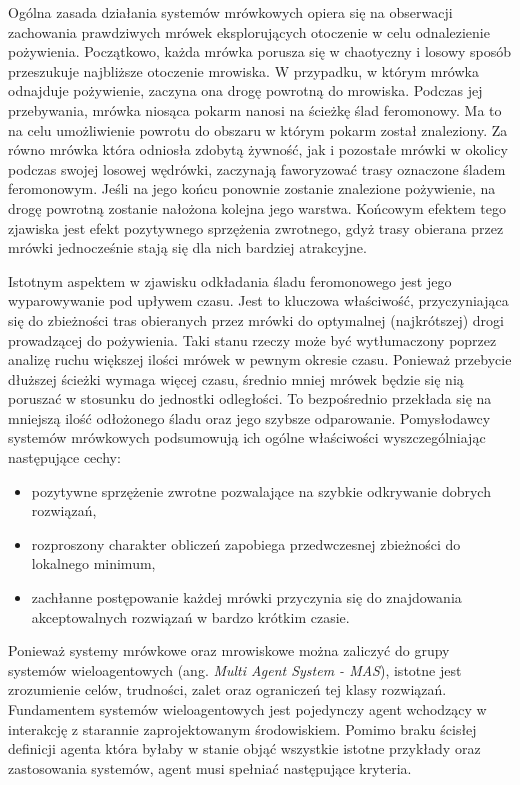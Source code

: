 {    Ogólna zasada działania systemów mrówkowych opiera się na obserwacji zachowania prawdziwych mrówek eksplorujących
    otoczenie w celu odnalezienie pożywienia. Początkowo, każda mrówka porusza się w chaotyczny i losowy sposób
    przeszukuje najbliższe otoczenie mrowiska. W przypadku, w którym mrówka odnajduje pożywienie, zaczyna ona drogę
    powrotną do mrowiska. Podczas jej przebywania, mrówka niosąca pokarm nanosi na ścieżkę ślad feromonowy. Ma to na
    celu umożliwienie powrotu do obszaru w którym pokarm został znaleziony. Za równo mrówka która odniosła zdobytą
    żywność, jak i pozostałe mrówki w okolicy podczas swojej losowej wędrówki, zaczynają faworyzować trasy oznaczone
    śladem feromonowym. Jeśli na jego końcu ponownie zostanie znalezione pożywienie, na drogę powrotną zostanie nałożona
    kolejna jego warstwa. Końcowym efektem tego zjawiska jest efekt pozytywnego sprzężenia zwrotnego, gdyż trasy
    obierana przez mrówki jednocześnie stają się dla nich bardziej atrakcyjne.

    Istotnym aspektem w zjawisku odkładania śladu feromonowego jest jego wyparowywanie pod upływem czasu. Jest to
    kluczowa właściwość, przyczyniająca się do zbieżności tras obieranych przez mrówki do optymalnej (najkrótszej) drogi
    prowadzącej do pożywienia. Taki stanu rzeczy może być wytłumaczony poprzez analizę ruchu większej ilości mrówek w
    pewnym okresie czasu. Ponieważ przebycie dłuższej ścieżki wymaga więcej czasu, średnio mniej mrówek będzie się nią
    poruszać w stosunku do jednostki odległości. To bezpośrednio przekłada się na mniejszą ilość odłożonego śladu oraz
    jego szybsze odparowanie. Pomysłodawcy systemów mrówkowych podsumowują ich ogólne właściwości wyszczególniając
    następujące cechy\cite{Dorigo1991AntSA}:

    \begin{itemize}
        \item pozytywne sprzężenie zwrotne pozwalające na szybkie odkrywanie dobrych rozwiązań,
        \item rozproszony charakter obliczeń zapobiega przedwczesnej zbieżności do lokalnego minimum,
        \item zachłanne postępowanie każdej mrówki przyczynia się do znajdowania akceptowalnych rozwiązań w bardzo
        krótkim czasie.
    \end{itemize}


    Ponieważ systemy mrówkowe oraz mrowiskowe można zaliczyć do grupy systemów wieloagentowych (ang. \textit{Multi Agent
    System - MAS}), istotne jest zrozumienie celów, trudności, zalet oraz ograniczeń tej klasy rozwiązań. Fundamentem
    systemów wieloagentowych jest pojedynczy agent wchodzący w interakcję z starannie zaprojektowanym środowiskiem.
    Pomimo braku ścisłej definicji agenta która byłaby w stanie objąć wszystkie istotne przykłady oraz zastosowania
    systemów, agent musi spełniać następujące kryteria\cite{Balaji2010AnIT}.

}
